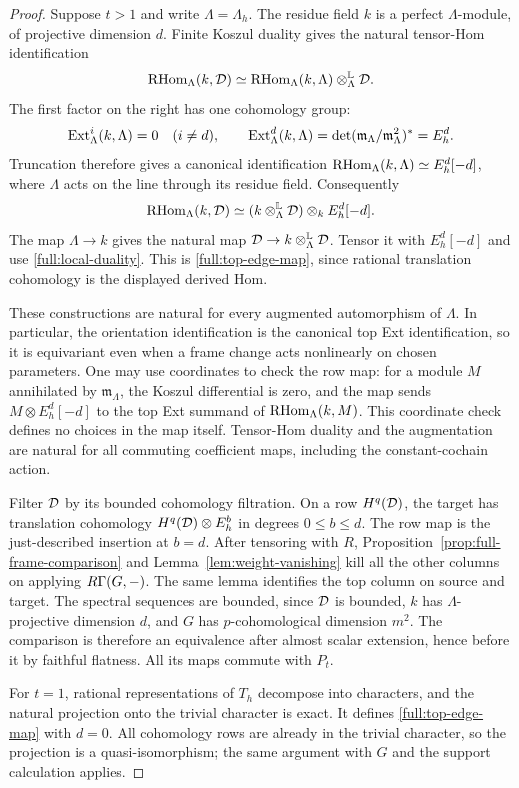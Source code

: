 \begin{proof}
Suppose $t>1$ and write $\Lambda=\Lambda_h$.
The residue field $k$ is a perfect $\Lambda$-module, of projective
dimension $d$.  Finite Koszul duality gives
the natural tensor-Hom identification
\[
 \operatorname{RHom}_\Lambda(k,\mathcal D)
   \simeq
 \operatorname{RHom}_\Lambda(k,\Lambda)\otimes_\Lambda^{\mathbb L}\mathcal D.
\]
The first factor on the right has one cohomology group:
\[
 \operatorname{Ext}_\Lambda^i(k,\Lambda)=0\quad(i\ne d),
 \qquad
 \operatorname{Ext}_\Lambda^d(k,\Lambda)
       =\det(\mathfrak m_\Lambda/\mathfrak m_\Lambda^2)^*=E_h^d.
\]
Truncation therefore gives a canonical identification
$\operatorname{RHom}_\Lambda(k,\Lambda)\simeq E_h^d[-d]$, where $\Lambda$
acts on the line through its residue field.  Consequently
\begin{equation}
\label{full:local-duality}
 \operatorname{RHom}_\Lambda(k,\mathcal D)
   \simeq
 (k\otimes_\Lambda^{\mathbb L}\mathcal D)\otimes_k E_h^d[-d].
\end{equation}
The map $\Lambda\to k$ gives the natural map
$\mathcal D\to k\otimes_\Lambda^{\mathbb L}\mathcal D$.
Tensor it with $E_h^d[-d]$ and use
\eqref{full:local-duality}.  This is
\eqref{full:top-edge-map}, since rational translation cohomology
is the displayed derived Hom.

These constructions are natural for every augmented automorphism
of $\Lambda$.  In particular, the orientation identification is
the canonical top Ext identification, so it is equivariant even
when a frame change acts nonlinearly on chosen parameters.
One may use coordinates to check the row map: for a module $M$
annihilated by $\mathfrak m_\Lambda$, the Koszul differential is
zero, and the map sends $M\otimes E_h^d[-d]$ to the top Ext
summand of $\operatorname{RHom}_\Lambda(k,M)$.
This coordinate check defines no choices in the map itself.
Tensor-Hom duality and the augmentation are natural for all
commuting coefficient maps, including the constant-cochain action.

Filter $\mathcal D$ by its bounded cohomology filtration.
On a row $H^q(\mathcal D)$, the target has translation cohomology
$H^q(\mathcal D)\otimes E_h^b$ in degrees $0\leq b\leq d$.
The row map is the just-described insertion at $b=d$.
After tensoring with $R$, Proposition~\ref{prop:full-frame-comparison}
and Lemma~\ref{lem:weight-vanishing} kill all the other columns
on applying $R\Gamma(G,-)$.
The same lemma identifies the top column on source and target.
The spectral sequences are bounded, since $\mathcal D$ is bounded,
$k$ has $\Lambda$-projective dimension $d$, and $G$ has
$p$-cohomological dimension $m^2$.
The comparison is therefore an equivalence after almost scalar
extension, hence before it by faithful flatness.
All its maps commute with $P_t$.

For $t=1$, rational representations of $T_h$ decompose into
characters, and the natural projection onto the trivial character
is exact.  It defines \eqref{full:top-edge-map} with $d=0$.
All cohomology rows are already in the trivial character,
so the projection is a quasi-isomorphism; the same argument
with $G$ and the support calculation applies.
\end{proof}

